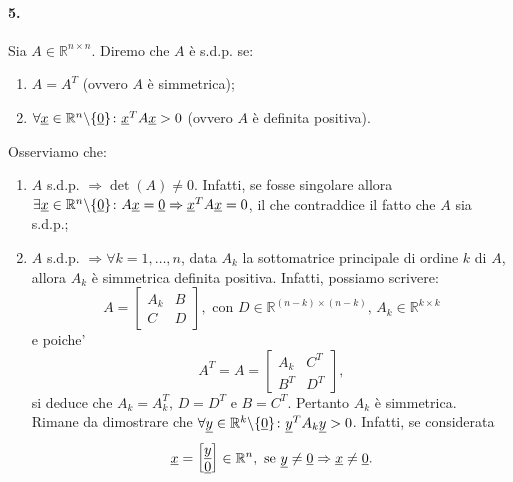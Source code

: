\paragraph{5.} Sia $A\in\mathbb{R}^{n\times n}$. Diremo che $A$ è s.d.p. se:
\begin{enumerate}
	\item $A=A^T$ (ovvero $A$ è simmetrica);
	\item $\forall\uline x\in\mathbb{R}^n\backslash\{\uline 0\}\colon \uline x^T A \uline x > 0$ (ovvero $A$ è definita positiva).
\end{enumerate}
Osserviamo che:
\begin{enumerate}
	\item $A$ s.d.p. $\Rightarrow\det(A)\neq 0$. Infatti, se fosse \gls{singolare} allora $\exists\uline x\in\mathbb{R}^n\backslash\{\uline 0\}\colon A\uline x = \uline 0 \Rightarrow \uline x^T A \uline x = 0$, il che contraddice il fatto che $A$ sia s.d.p.;
	\item $A$ s.d.p. $\Rightarrow \forall k=1,\hdots, n$, data $A_k$ la sottomatrice principale di ordine $k$ di $A$, allora $A_k$ è simmetrica definita positiva. Infatti, possiamo scrivere:
	\begin{equation*}
		A=\left[
		\begin{array}{c|c}
			A_k & B\\
			\hline
			C & D
		\end{array}
		\right], \text{ con } D\in\mathbb R^{(n-k)\times (n-k)},\, A_k\in\mathbb{R}^{k\times k}
	\end{equation*}
	e poiche'
	\begin{equation*}
		A^T=A=\left[
		\begin{array}{c|c}
			A_k & C^T\\
			\hline
			B^T & D^T
		\end{array}
		\right],
	\end{equation*}
	si deduce che $A_k=A_k^T,\, D=D^T$ e $B = C^T$. Pertanto $A_k$ è simmetrica.\\
	Rimane da dimostrare che $\forall\uline y\in\mathbb{R}^k\backslash\{\uline 0\}\colon\uline y^T A_k \uline y > 0$. Infatti, se considerata
	\begin{equation*}
		\uline x = 
		\begin{bmatrix}
			\uline y\\
			\uline 0
		\end{bmatrix}\in\mathbb{R}^n, \text{ se } \uline y\neq\uline 0 \Rightarrow\uline x \neq \uline 0.
	\end{equation*}

\end{enumerate}
